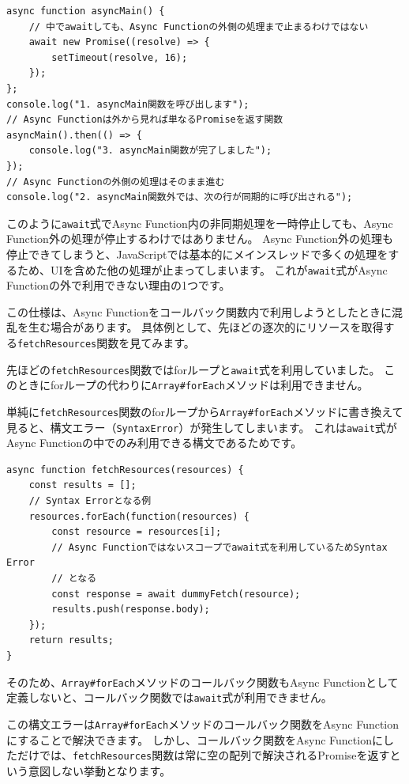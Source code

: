 \begin{lstlisting}
async function asyncMain() {
    // 中でawaitしても、Async Functionの外側の処理まで止まるわけではない
    await new Promise((resolve) => {
        setTimeout(resolve, 16);
    });
};
console.log("1. asyncMain関数を呼び出します");
// Async Functionは外から見れば単なるPromiseを返す関数
asyncMain().then(() => {
    console.log("3. asyncMain関数が完了しました");
});
// Async Functionの外側の処理はそのまま進む
console.log("2. asyncMain関数外では、次の行が同期的に呼び出される");
\end{lstlisting}

このように\texttt{await}式でAsync
Function内の非同期処理を一時停止しても、Async
Function外の処理が停止するわけではありません。 Async
Function外の処理も停止できてしまうと、JavaScriptでは基本的にメインスレッドで多くの処理をするため、UIを含めた他の処理が止まってしまいます。
これが\texttt{await}式がAsync
Functionの外で利用できない理由の1つです。

この仕様は、Async
Functionをコールバック関数内で利用しようとしたときに混乱を生む場合があります。
具体例として、先ほどの逐次的にリソースを取得する\texttt{fetchResources}関数を見てみます。

先ほどの\texttt{fetchResources}関数ではforループと\texttt{await}式を利用していました。
このときにforループの代わりに\texttt{Array\#forEach}メソッドは利用できません。

単純に\texttt{fetchResources}関数のforループから\texttt{Array\#forEach}メソッドに書き換えて見ると、構文エラー（\texttt{SyntaxError}）が発生してしまいます。
これは\texttt{await}式がAsync
Functionの中でのみ利用できる構文であるためです。

\begin{lstlisting}
async function fetchResources(resources) {
    const results = [];
    // Syntax Errorとなる例
    resources.forEach(function(resources) {
        const resource = resources[i];
        // Async Functionではないスコープでawait式を利用しているためSyntax Error
        // となる
        const response = await dummyFetch(resource);
        results.push(response.body);
    });
    return results;
}
\end{lstlisting}

そのため、\texttt{Array\#forEach}メソッドのコールバック関数もAsync
Functionとして定義しないと、コールバック関数では\texttt{await}式が利用できません。

この構文エラーは\texttt{Array\#forEach}メソッドのコールバック関数をAsync
Functionにすることで解決できます。 しかし、コールバック関数をAsync
Functionにしただけでは、\texttt{fetchResources}関数は常に空の配列で解決されるPromiseを返すという意図しない挙動となります。

